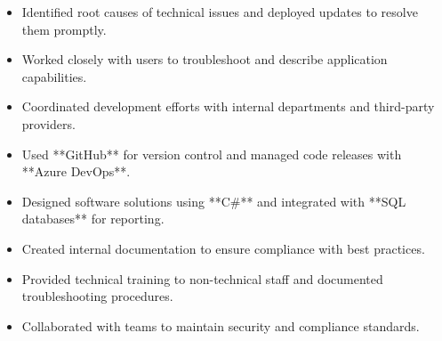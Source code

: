 \par\smallskip
\noindent
\begin{minipage}{20cm}
  \begin{minipage}{9.75cm}
    \begin{itemize}
      \item Identified root causes of technical issues and deployed updates to resolve them promptly.
      \item Worked closely with users to troubleshoot and describe application capabilities.
    \end{itemize}
  \end{minipage}
  \hfill
  \begin{minipage}{9.75cm}
    \begin{itemize}
      \item Coordinated development efforts with internal departments and third-party providers.
      \item Used **GitHub** for version control and managed code releases with **Azure DevOps**.
    \end{itemize}
  \end{minipage}
\end{minipage}
\par\smallskip
\divider

\par\smallskip
\noindent
\begin{minipage}{20cm}
  \begin{minipage}{9.75cm}
    \begin{itemize}
      \item Designed software solutions using **C#** and integrated with **SQL databases** for reporting.
      \item Created internal documentation to ensure compliance with best practices.
    \end{itemize}
  \end{minipage}
  \hfill
  \begin{minipage}{9.75cm}
    \begin{itemize}
      \item Provided technical training to non-technical staff and documented troubleshooting procedures.
      \item Collaborated with teams to maintain security and compliance standards.
    \end{itemize}
  \end{minipage}
\end{minipage}

